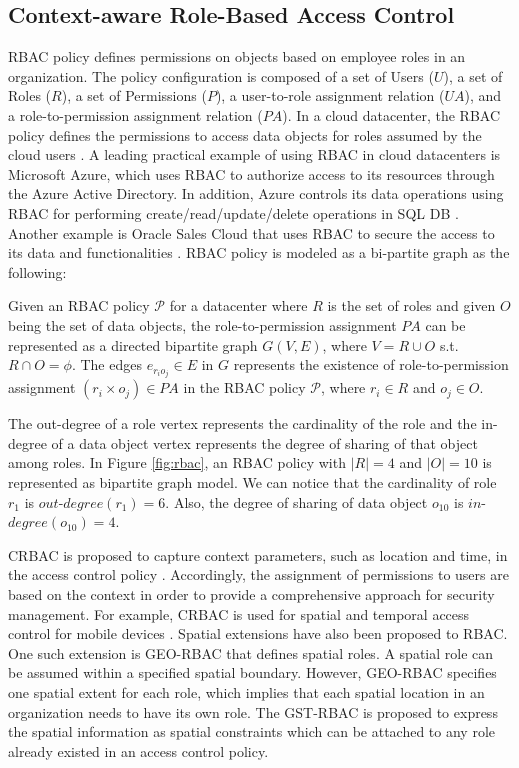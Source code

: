 \subsection{Context-aware Role-Based Access Control}
RBAC policy defines permissions on objects based on employee roles in an organization. The policy configuration is composed of a set of Users ($U$), a set of Roles ($R$), a set of Permissions ($P$), a user-to-role assignment relation ($UA$), and a role-to-permission assignment relation ($PA$). In a cloud datacenter, the RBAC policy defines the permissions to access data objects for roles assumed by the cloud users \cite{ferraiolo2001proposed}. A leading practical example of using RBAC in cloud datacenters is Microsoft Azure, which uses RBAC to authorize access to its resources through the Azure Active Directory. In addition, Azure controls its data operations using RBAC for performing create/read/update/delete operations in SQL DB \cite{Azure}. Another example is Oracle Sales Cloud that uses RBAC to secure the access to its data and functionalities \cite{oracle}. RBAC policy is modeled as a bi-partite graph as the following:
\begin{definition}
 Given an RBAC policy $ \mathcal{P}$ for a datacenter where $R$ is the set of roles and given $O$ being the set of data objects,  the role-to-permission assignment $PA$ can be represented as a directed bipartite graph $G(V,E)$, where $V=R\cup O$ s.t. $R\cap O=\phi$. The edges $e_{r_i o_j}\in E$ in $G$ represents the existence of role-to-permission assignment $(r_i\times o_j)\in PA$  in the RBAC policy $\mathcal{P}$, where $r_i \in R$ and $o_j \in O$.
\end{definition}

The out-degree of a role vertex  represents the cardinality of the role and the in-degree of a data object vertex represents the degree of sharing of that object among roles. In Figure \ref{fig:rbac}, an RBAC policy with $|R|=4$ and $|O|=10$ is represented as bipartite graph model. We can notice that the cardinality of role $r_1$ is $out$-$degree(r_1) = 6$. Also, the degree of sharing of data object $o_{10}$ is $in$-$degree(o_{10}) = 4$.

CRBAC is proposed to capture context parameters, such as location and time, in the access control policy \cite{samuel2008context}. Accordingly, the assignment of permissions to users are based on the context in order to provide a comprehensive approach for security management. For example, CRBAC is used for spatial and temporal access control for mobile devices \cite{shebaro2015context}. Spatial extensions have also been proposed to RBAC. One such extension is GEO-RBAC that defines spatial roles. A spatial role can be assumed within a specified spatial boundary. However, GEO-RBAC specifies one spatial extent for each role, which implies that each spatial location in an organization needs to have its own role. The GST-RBAC \cite{Arjmand15} is proposed to express the spatial information as spatial constraints which can be attached to any role already existed in an access control policy. 


